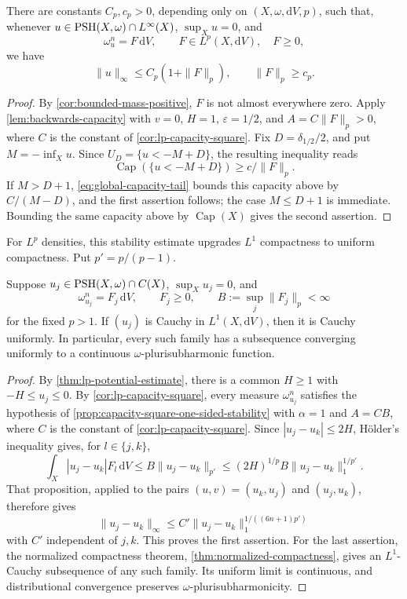 \begin{theorem}\label{thm:lp-potential-estimate}
There are constants $C_p,c_p>0$, depending only on $(X,\omega,\mathrm{d}V,p)$, such that, whenever
$u\in\mathrm{PSH}(X,\omega)\cap L^\infty(X)$, $\sup_Xu=0$, and
\[
 \omega_u^n=F\,\mathrm{d}V,\qquad F\in L^p(X,\mathrm{d}V),\quad F\geq0,
\]
we have
\begin{equation}\label{eq:lp-potential-bound}
 \|u\|_\infty\leq C_p(1+\|F\|_p),
 \qquad \|F\|_p\geq c_p.
\end{equation}
\end{theorem}
\begin{proof}
By \cref{cor:bounded-mass-positive}, $F$ is not almost everywhere zero. Apply \cref{lem:backwards-capacity} with $v=0$, $H=1$, $\varepsilon=1/2$, and $A=C\|F\|_p>0$, where $C$ is the constant of \cref{cor:lp-capacity-square}. Fix $D=\delta_{1/2}/2$, and put $M=-\inf_Xu$. Since $U_D=\{u<-M+D\}$, the resulting inequality reads
\[
 \operatorname{Cap}(\{u<-M+D\})\geq c/\|F\|_p.
\]
If $M>D+1$, \eqref{eq:global-capacity-tail} bounds this capacity above by $C/(M-D)$, and the first assertion follows; the case $M\leq D+1$ is immediate. Bounding the same capacity above by $\operatorname{Cap}(X)$ gives the second assertion.
\end{proof}



For $L^p$ densities, this stability estimate upgrades $L^1$ compactness to uniform compactness. Put $p'=p/(p-1)$.

\begin{theorem}\label{thm:lp-uniform-compactness}
Suppose $u_j\in\mathrm{PSH}(X,\omega)\cap C(X)$, $\sup_Xu_j=0$, and
\[
 \omega_{u_j}^n=F_j\,\mathrm{d}V,\qquad F_j\geq0,\qquad B:=\sup_j\|F_j\|_p<\infty
\]
for the fixed $p>1$. If $(u_j)$ is Cauchy in $L^1(X,\mathrm{d}V)$, then it is Cauchy uniformly. In particular, every such family has a subsequence converging uniformly to a continuous $\omega$-plurisubharmonic function.
\end{theorem}
\begin{proof}
By \cref{thm:lp-potential-estimate}, there is a common $H\geq1$ with $-H\leq u_j\leq0$. By \cref{cor:lp-capacity-square}, every measure $\omega_{u_j}^n$ satisfies the hypothesis of \cref{prop:capacity-square-one-sided-stability} with $\alpha=1$ and $A=CB$, where $C$ is the constant of \cref{cor:lp-capacity-square}. Since $|u_j-u_k|\leq2H$, H\"older's inequality gives, for $l\in\{j,k\}$,
\[
 \int_X|u_j-u_k|F_l\,\mathrm{d}V\leq B\|u_j-u_k\|_{p'}
 \leq(2H)^{1/p}B\|u_j-u_k\|_1^{1/p'}.
\]
That proposition, applied to the pairs $(u,v)=(u_k,u_j)$ and $(u_j,u_k)$, therefore gives
\[
 \|u_j-u_k\|_\infty\leq C'\|u_j-u_k\|_1^{1/((6n+1)p')}
\]
with $C'$ independent of $j,k$. This proves the first assertion. For the last assertion, the normalized compactness theorem, \cref{thm:normalized-compactness}, gives an $L^1$-Cauchy subsequence of any such family. Its uniform limit is continuous, and distributional convergence preserves $\omega$-plurisubharmonicity.
\end{proof}

